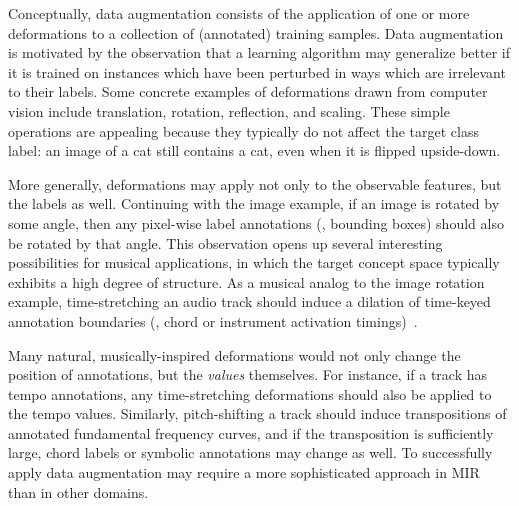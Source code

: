 \documentclass{article}
\begin{document}
Conceptually, data augmentation consists of the application of one or more deformations to
a collection of (annotated) training samples.
Data augmentation is motivated by the observation that a learning algorithm may
generalize better if it is trained on instances which have been perturbed in ways 
which are irrelevant to their labels.
Some concrete examples of deformations drawn from computer vision include translation,
rotation, reflection, and scaling.
These simple operations are appealing because they typically do not affect the target 
class label: an image of a cat still contains a cat, even when it is flipped upside-down.

More generally, deformations may apply not only to the observable features, but the labels as well.
Continuing with the image example, if an image is rotated by some angle, 
then any pixel-wise label annotations (\eg, bounding boxes) should also be rotated by
that angle.
This observation opens up several interesting possibilities for musical applications, in
which the target concept space typically exhibits a high degree of structure.
As a musical analog to the image rotation example, time-stretching an audio track 
should induce a dilation of time-keyed annotation boundaries (\eg, chord or instrument
activation timings)~\cite{mauch2013audio}.

Many natural, musically-inspired deformations would not only change the position of
annotations, but the \emph{values} themselves.
For instance, if a track has tempo annotations, any time-stretching deformations should
also be applied to the tempo values.
Similarly, pitch-shifting a track should induce transpositions of annotated fundamental
frequency curves, and if the transposition is sufficiently large, chord labels or symbolic 
annotations may change as well.
To successfully apply data augmentation may require a more sophisticated approach in MIR
than in other domains.

\end{document}
